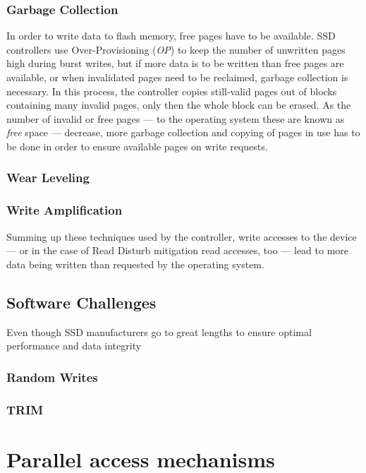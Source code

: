 \documentclass{acm_proc_article-sp}
\begin{document}
\subsubsection*{Garbage Collection}
In order to write data to flash memory, free pages have to be available. SSD controllers use Over-Provisioning (\emph{OP}) to keep the number of unwritten pages high during burst writes, but if more data is to be written than free pages are available, or when invalidated pages need to be reclaimed, garbage collection is necessary. In this process, the controller copies still-valid pages out of blocks containing many invalid pages, only then the whole block can be erased. As the number of invalid or free pages --- to the operating system these are known as \emph{free} space --- decrease, more garbage collection and copying of pages in use has to be done in order to ensure available pages on write requests.

\subsubsection*{Wear Leveling}


\subsubsection*{Write Amplification}
Summing up these techniques used by the controller, write accesses to the device --- or in the case of Read Disturb mitigation read accesses, too --- lead to more data being written than requested by the operating system. %

\subsection{Software Challenges}
Even though SSD manufacturers go to great lengths to ensure optimal performance and data integrity

\subsubsection*{Random Writes}

\subsubsection*{TRIM}

\section{Parallel access mechanisms}
\end{document}
